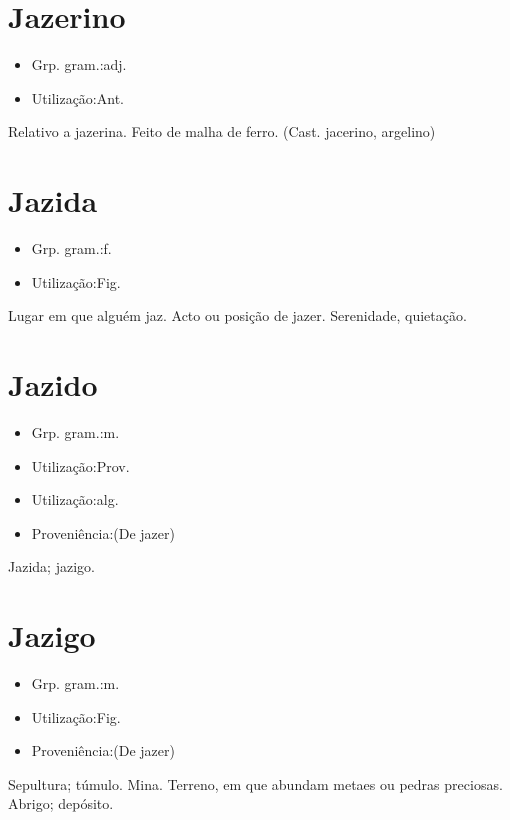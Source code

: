 \documentclass{article}
\begin{document}
\section{Jazerino}
\begin{itemize}
\item {Grp. gram.:adj.}
\end{itemize}
\begin{itemize}
\item {Utilização:Ant.}
\end{itemize}
Relativo a jazerina.
Feito de malha de ferro.
(Cast. \textunderscore jacerino\textunderscore , argelino)
\section{Jazida}
\begin{itemize}
\item {Grp. gram.:f.}
\end{itemize}
\begin{itemize}
\item {Utilização:Fig.}
\end{itemize}
Lugar em que alguém jaz.
Acto ou posição de jazer.
Serenidade, quietação.
\section{Jazido}
\begin{itemize}
\item {Grp. gram.:m.}
\end{itemize}
\begin{itemize}
\item {Utilização:Prov.}
\end{itemize}
\begin{itemize}
\item {Utilização:alg.}
\end{itemize}
\begin{itemize}
\item {Proveniência:(De \textunderscore jazer\textunderscore )}
\end{itemize}
Jazida; jazigo.
\section{Jazigo}
\begin{itemize}
\item {Grp. gram.:m.}
\end{itemize}
\begin{itemize}
\item {Utilização:Fig.}
\end{itemize}
\begin{itemize}
\item {Proveniência:(De \textunderscore jazer\textunderscore )}
\end{itemize}
Sepultura; túmulo.
Mina.
Terreno, em que abundam metaes ou pedras preciosas.
Abrigo; depósito.
\end{document}
